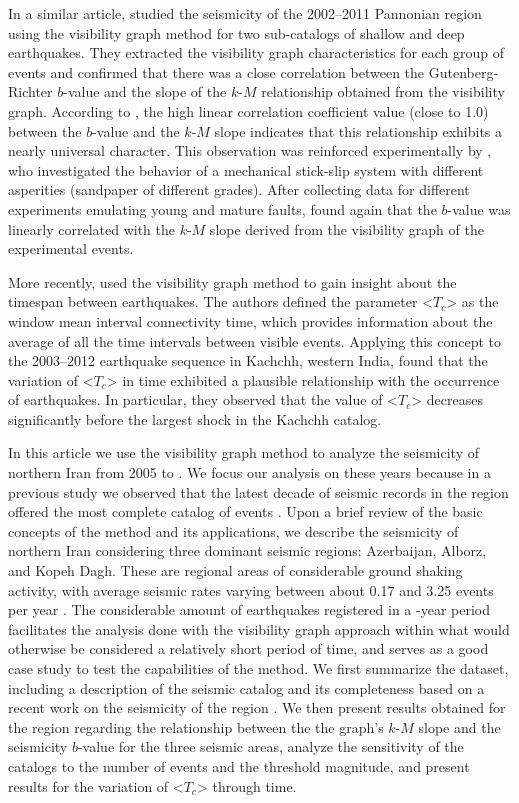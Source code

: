 In a similar article, \citet{Telesca2014} studied the seismicity of the 2002--2011 Pannonian region using the visibility graph method for two sub-catalogs of shallow and deep earthquakes. They extracted the visibility graph characteristics for each group of events and confirmed that there was a close correlation between the Gutenberg-Richter $b$-value and the slope of the $k$-$M$ relationship obtained from the visibility graph. According to \citet{Telesca2014}, the high linear correlation coefficient value (close to 1.0) between the $b$-value and the $k$-$M$ slope indicates that this relationship exhibits a nearly universal character. This observation was reinforced experimentally by \citet{Telesca2014-pone}, who investigated the behavior of a mechanical stick-slip system with different asperities (sandpaper of different grades). After collecting data for different experiments emulating young and mature faults, \citet{Telesca2014-pone} found again that the $b$-value was linearly correlated with the $k$-$M$ slope derived from the visibility graph of the experimental events.

More recently, \citet{Telesca2016} used the visibility graph method to gain insight about the timespan between earthquakes. The authors defined the parameter <$T_c$> as the window mean interval connectivity time, which provides information about the average of all the time intervals between visible events. Applying this concept to the 2003--2012 earthquake sequence in Kachchh, western India, \citet{Telesca2016} found that the variation of <$T_c$> in time exhibited a plausible relationship with the occurrence of earthquakes. In particular, they observed that the value of <$T_c$> decreases significantly before the largest shock in the Kachchh catalog.

In this article we use the visibility graph method to analyze the seismicity of northern Iran from 2005 to . We focus our analysis on these years because in a previous study we observed that the latest decade of seismic records in the region offered the most complete catalog of events \citep[][]{Khoshnevis2017}. Upon a brief review of the basic concepts of the method and its applications, we describe the seismicity of northern Iran considering three dominant seismic regions: Azerbaijan, Alborz, and Kopeh Dagh. These are regional areas of considerable ground shaking activity, with average seismic rates varying between about 0.17 and 3.25 events per year \citep[e.g.,][]{Nemati2015}. The considerable amount of earthquakes registered in a -year period facilitates the analysis done with the visibility graph approach within what would otherwise be considered a relatively short period of time, and serves as a good case study to test the capabilities of the method. We first summarize the dataset, including a description of the seismic catalog and its completeness based on a recent work on the seismicity of the region \citep{Khoshnevis2017}. We then present results obtained for the region regarding the relationship between the the graph's $k$-$M$ slope and the seismicity $b$-value for the three seismic areas, analyze the sensitivity of the catalogs to the number of events and the threshold magnitude, and present results for the variation of <$T_c$> through time.
